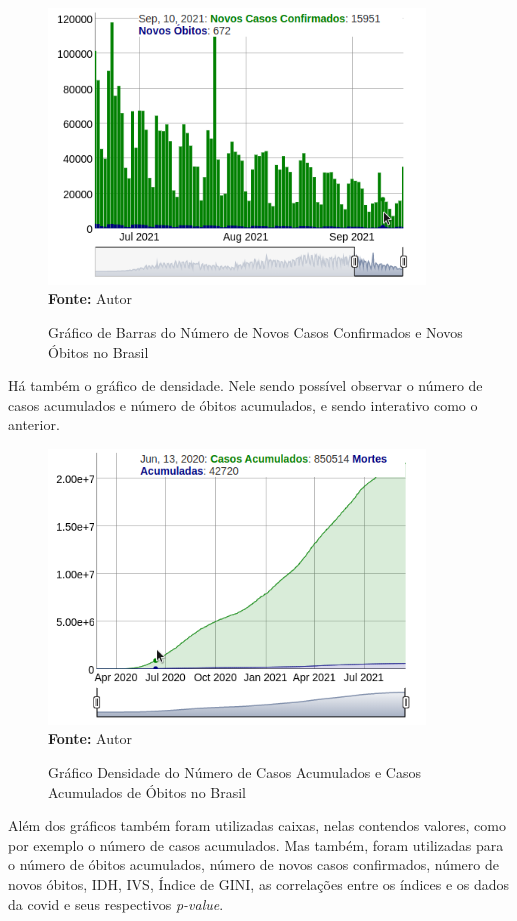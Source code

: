 \documentclass[
  fleqn,ebook]{ic}
\begin{document}
\begin{figure}[H]
    \centering
    \caption{Gráfico de Barras do Número de Novos Casos Confirmados e Novos Óbitos no Brasil}
    \includegraphics[width=10cm]{img/barra.png} \\
    {\footnotesize \textbf{Fonte: }Autor}
    \label{fig:barra}
\end{figure}

Há também o gráfico de densidade. Nele sendo possível observar o número de casos
acumulados e número de óbitos acumulados, e sendo interativo como o anterior.

\begin{figure}[H]
    \centering
    \caption{Gráfico Densidade do Número de Casos Acumulados e Casos Acumulados de Óbitos no Brasil}
    \includegraphics[width=10cm]{img/densidade.png} \\
    {\footnotesize \textbf{Fonte: }Autor}
    \label{fig:densidade}
\end{figure}

Além dos gráficos também foram utilizadas caixas, nelas contendos valores, como
por exemplo o número de casos acumulados. Mas também, foram utilizadas para o
número de óbitos acumulados, número de novos casos confirmados, número de novos
óbitos, IDH, IVS, Índice de GINI, as correlações entre os índices e os dados da
covid e seus respectivos \emph{p-value}.
\end{document}
